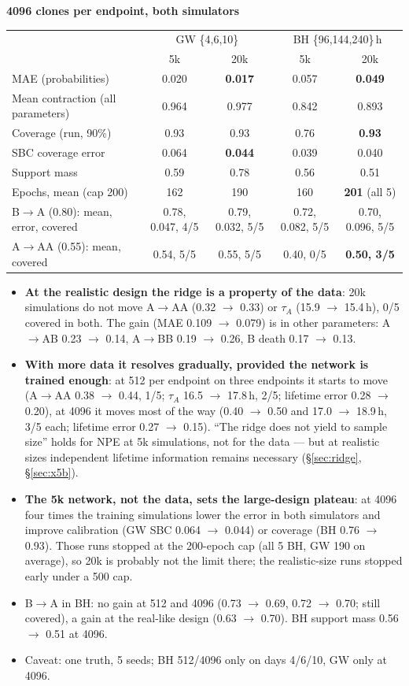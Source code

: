 \documentclass[10pt,a4paper]{article}
\newcommand{\tA}{$\tau_A$}
\newcommand{\blk}[1]{\par\needspace{5\baselineskip}\smallskip{\sffamily\bfseries\color{inkgray}#1}\par}
\newcommand{\Comment}{\blk{Comment}}
\renewcommand{\blk}[1]{\par\Needspace*{5\baselineskip}\smallskip{\sffamily\bfseries\color{inkgray}#1}\par}
\begin{document}
\begin{center}
\medskip\textbf{4096 clones per endpoint, both simulators}\\[2pt]
\setlength{\tabcolsep}{6pt}
\begin{tabular}{@{}lcccc@{}}\toprule
 & \multicolumn{2}{c}{GW \{4,6,10\}} & \multicolumn{2}{c}{BH \{96,144,240\}\,h} \\
 & 5k & 20k & 5k & 20k \\\midrule
MAE (probabilities) & 0.020 & \textbf{0.017} & 0.057 & \textbf{0.049} \\
Mean contraction (all parameters) & 0.964 & 0.977 & 0.842 & 0.893 \\
Coverage (run, 90\%) & 0.93 & 0.93 & 0.76 & \textbf{0.93} \\
SBC coverage error & 0.064 & \textbf{0.044} & 0.039 & 0.040 \\
Support mass & 0.59 & 0.78 & 0.56 & 0.51 \\
Epochs, mean (cap 200) & 162 & 190 & 160 & \textbf{201} (all 5) \\
B$\to$A (0.80): mean, error, covered & 0.78, 0.047, 4/5 & 0.79, 0.032, 5/5 & 0.72, 0.082, 5/5 & 0.70, 0.096, 5/5 \\
A$\to$AA (0.55): mean, covered & 0.54, 5/5 & 0.55, 5/5 & 0.40, 0/5 & \textbf{0.50, 3/5} \\\bottomrule
\end{tabular}
\end{center}
\Comment
\begin{itemize}
\item \textbf{At the realistic design the ridge is a property of the data}: 20k simulations do not move A$\to$AA (0.32 $\to$ 0.33) or \tA{} (15.9 $\to$ 15.4\,h), 0/5 covered in both. The gain (MAE 0.109 $\to$ 0.079) is in other parameters: A$\to$AB 0.23 $\to$ 0.14, A$\to$BB 0.19 $\to$ 0.26, B death 0.17 $\to$ 0.13.
\item \textbf{With more data it resolves gradually, provided the network is trained enough}: at 512 per endpoint on three endpoints it starts to move (A$\to$AA 0.38 $\to$ 0.44, 1/5; \tA{} 16.5 $\to$ 17.8\,h, 2/5; lifetime error 0.28 $\to$ 0.20), at 4096 it moves most of the way (0.40 $\to$ 0.50 and 17.0 $\to$ 18.9\,h, 3/5 each; lifetime error 0.27 $\to$ 0.15). ``The ridge does not yield to sample size'' holds for NPE at 5k simulations, not for the data --- but at realistic sizes independent lifetime information remains necessary (\S\ref{sec:ridge}, \S\ref{sec:x5b}).
\item \textbf{The 5k network, not the data, sets the large-design plateau}: at 4096 four times the training simulations lower the error in both simulators and improve calibration (GW SBC 0.064 $\to$ 0.044) or coverage (BH 0.76 $\to$ 0.93). Those runs stopped at the 200-epoch cap (all 5 BH, GW 190 on average), so 20k is probably not the limit there; the realistic-size runs stopped early under a 500 cap.
\item B$\to$A in BH: no gain at 512 and 4096 (0.73 $\to$ 0.69, 0.72 $\to$ 0.70; still covered), a gain at the real-like design (0.63 $\to$ 0.70). BH support mass 0.56 $\to$ 0.51 at 4096.
\item Caveat: one truth, 5 seeds; BH 512/4096 only on days 4/6/10, GW only at 4096.
\end{itemize}
\end{document}

